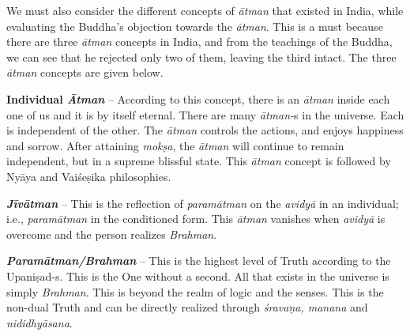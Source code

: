 We must also consider the different concepts of \textit{ātman} that existed in India, while evaluating the Buddha’s objection towards the \textit{ātman}. This is a must because there are three \textit{ātman} concepts in India, and from the teachings of the Buddha, we can see that he rejected only two of them, leaving the third intact. The three \textit{ātman} concepts are given below.

\textbf{Individual \textit{Ātman}} – According to this concept, there is an \textit{ātman} inside each one of us and it is by itself eternal. There are many \textit{ātman-}s in the universe. Each is independent of the other. The \textit{ātman} controls the actions, and enjoys happiness and sorrow. After attaining \textit{mokṣa}, the \textit{ātman} will continue to remain independent, but in a supreme blissful state. This \textit{ātman} concept is followed by Nyāya and Vaiśeṣika philosophies.

\textit{\textbf{Jīvātman}} – This is the reflection of \textit{paramātman} on the \textit{avidyā} in an individual; i.e., \textit{paramātman} in the conditioned form. This \textit{ātman} vanishes when \textit{avidyā} is overcome and the person realizes \textit{Brahman}.

\textbf{\textit{Paramātman/Brahman}} – This is the highest level of Truth according to the Upaniṣad-s. This is the One without a second. All that exists in the universe is simply \textit{Brahman}. This is beyond the realm of logic and the senses. This is the non-dual Truth and can be directly realized through \textit{śravaṇa, manana} and \textit{nididhyāsana}.

